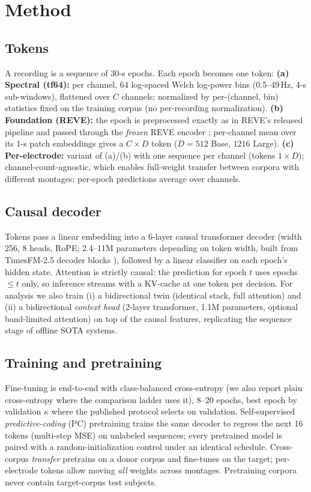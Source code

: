 \documentclass[conference,10pt]{IEEEtran}
\begin{document}
\section{Method}
\subsection{Tokens}
A recording is a sequence of 30-s epochs. Each epoch becomes one token:
\textbf{(a) Spectral (tf64):} per channel, 64 log-spaced Welch log-power bins (0.5--49\,Hz, 4-s sub-windows), flattened over $C$ channels; normalized by per-(channel, bin) statistics fixed on the training corpus (no per-recording normalization).
\textbf{(b) Foundation (REVE):} the epoch is preprocessed exactly as in REVE's released pipeline and passed through the \emph{frozen} REVE encoder \cite{reve}; per-channel mean over its 1-s patch embeddings gives a $C\times D$ token ($D{=}512$ Base, $1216$ Large).
\textbf{(c) Per-electrode:} variant of (a)/(b) with one sequence per channel (tokens $1\times D$); channel-count-agnostic, which enables full-weight transfer between corpora with different montages; per-epoch predictions average over channels.

\subsection{Causal decoder}
Tokens pass a linear embedding into a 6-layer causal transformer decoder (width 256, 8 heads, RoPE; 2.4--11M parameters depending on token width, built from TimesFM-2.5 decoder blocks \cite{timesfm}), followed by a linear classifier on each epoch's hidden state. Attention is strictly causal: the prediction for epoch $t$ uses epochs $\leq t$ only, so inference streams with a KV-cache at one token per decision. For analysis we also train (i) a bidirectional twin (identical stack, full attention) and (ii) a bidirectional \emph{context head} (2-layer transformer, 1.1M parameters, optional band-limited attention) on top of the causal features, replicating the sequence stage of offline SOTA systems.

\subsection{Training and pretraining}
Fine-tuning is end-to-end with class-balanced cross-entropy (we also report plain cross-entropy where the comparison ladder uses it), 8--20 epochs, best epoch by validation $\kappa$ where the published protocol selects on validation. Self-supervised \emph{predictive-coding} (PC) pretraining trains the same decoder to regress the next 16 tokens (multi-step MSE) on unlabeled sequences; every pretrained model is paired with a random-initialization control under an identical schedule. Cross-corpus \emph{transfer} pretrains on a donor corpus and fine-tunes on the target; per-electrode tokens allow moving \emph{all} weights across montages. Pretraining corpora never contain target-corpus test subjects.
\end{document}
